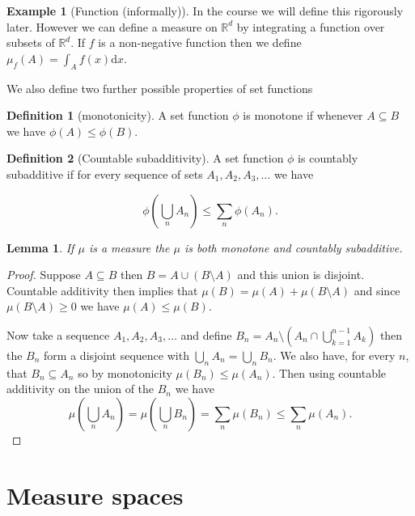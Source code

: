 \documentclass[
]{book}
\newtheorem{lemma}{Lemma}[chapter]
\theoremstyle{definition}
\newtheorem{definition}{Definition}[chapter]
\theoremstyle{definition}
\newtheorem{example}{Example}[chapter]
\theoremstyle{definition}
\theoremstyle{definition}
\theoremstyle{remark}
\begin{document}
\begin{example}[Function (informally)]
In the course we will define this rigorously later. However we can define a measure on \(\mathbb{R}^d\) by integrating a function over subsets of \(\mathbb{R}^d\). If \(f\) is a non-negative function then we define \(\mu_f(A) = \int_A f(x) \mathrm{d}x\).
\end{example}

We also define two further possible properties of set functions

\begin{definition}[monotonicity]
A set function \(\phi\) is monotone if whenever \(A \subseteq B\) we have \(\phi(A) \leq \phi(B)\).
\end{definition}

\begin{definition}[Countable subadditivity]
A set function \(\phi\) is countably subadditive if for every sequence of sets \(A_1, A_2, A_3, \dots\) we have

\[ \phi \left( \bigcup_n A_n \right) \leq \sum_n \phi(A_n). \]
\end{definition}

\begin{lemma}
If \(\mu\) is a measure the \(\mu\) is both monotone and countably subadditive.
\end{lemma}

\begin{proof}
Suppose \(A \subseteq B\) then \(B = A \cup (B \setminus A)\) and this union is disjoint. Countable additivity then implies that \(\mu(B) = \mu(A) + \mu(B \setminus A)\) and since \(\mu(B \setminus A) \geq 0\) we have \(\mu(A) \leq \mu(B)\).

Now take a sequence \(A_1, A_2, A_3, \dots\) and define \(B_n = A_n \setminus \left(A_n \cap \bigcup_{k=1}^{n-1}A_k \right)\) then the \(B_n\) form a disjoint sequence with \(\bigcup_n A_n = \bigcup_n B_n\). We also have, for every \(n\), that \(B_n \subseteq A_n\) so by monotonicity \(\mu(B_n) \leq \mu(A_n)\). Then using countable additivity on the union of the \(B_n\) we have
\[ \mu(\bigcup_n A_n) = \mu(\bigcup_n B_n) = \sum_n \mu(B_n) \leq \sum_n \mu(A_n). \]
\end{proof}

\hypertarget{measure-spaces}{%
\section{Measure spaces}\label{measure-spaces}}
\end{document}
